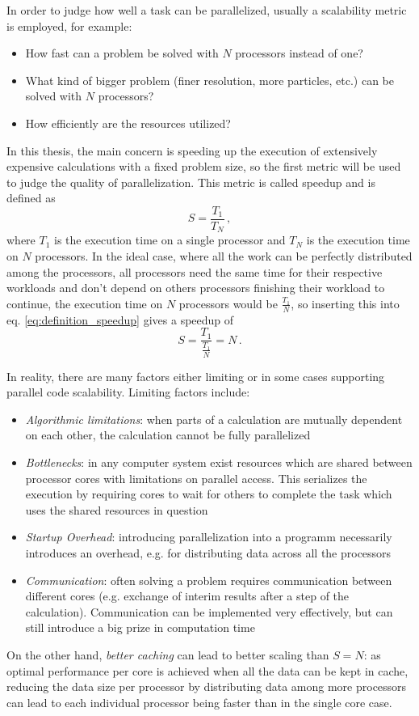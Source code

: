 \documentclass[main.tex]{subfiles}
\begin{document}
In order to judge how well a task can be parallelized, usually a scalability metric is employed, for example:
\begin{itemize}
    \item How fast can a problem be solved with \(N\) processors instead of one?
    \item What kind of bigger problem (finer resolution, more particles, etc.) can be solved with \(N\) processors?
    \item How efficiently are the resources utilized?
\end{itemize}
In this thesis, the main concern is speeding up the execution of extensively expensive calculations with a fixed problem size, so the first metric will be used to judge the quality of parallelization.
This metric is called speedup and is defined as 
\begin{equation}\label{eq:definition_speedup}
    S = \frac{T_1}{T_N}\,, 
\end{equation}
where \(T_1\) is the execution time on a single processor and \(T_N\) is the execution time on \(N\) processors.
In the ideal case, where all the work can be perfectly distributed among the processors, all processors need the same time for their respective workloads and don't depend on others processors finishing their workload to continue, the execution time on \(N\) processors would be \(\frac{T_1}{N}\), so inserting this into eq. \ref{eq:definition_speedup} gives a speedup of
\begin{equation}
    S = \frac{T_1}{\frac{T_1}{N}} = N\,.
\end{equation}

In reality, there are many factors either limiting or in some cases supporting parallel code scalability. Limiting factors include:
\begin{itemize}
    \item \emph{Algorithmic limitations}: when parts of a calculation are mutually dependent on each other, the calculation cannot be fully parallelized
    \item \emph{Bottlenecks}: in any computer system exist resources which are shared between processor cores with limitations on parallel access. This serializes the execution by requiring cores to wait for others to complete the task which uses the shared resources in question
    \item \emph{Startup Overhead}: introducing parallelization into a programm necessarily introduces an overhead, e.g. for distributing data across all the processors
    \item \emph{Communication}: often solving a problem requires communication between different cores (e.g. exchange of interim results after a step of the calculation). Communication can be implemented very effectively, but can still introduce a big prize in computation time
\end{itemize}
On the other hand, \emph{better caching} can lead to better scaling than \(S = N\): as optimal performance per core is achieved when all the data can be kept in cache, reducing the data size per processor by distributing data among more processors can lead to each individual processor being faster than in the single core case.
\end{document}
